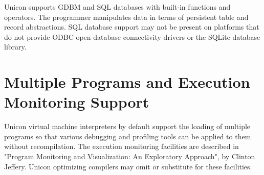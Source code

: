 Unicon supports GDBM and SQL databases with
built-in functions and operators. The programmer manipulates data in
terms of persistent table and record abstractions. SQL database support
may not be present on platforms that do not provide ODBC
open database connectivity drivers or the  SQLite database library.

\section{Multiple Programs and Execution Monitoring Support}

Unicon virtual machine interpreters by default support the loading of
multiple programs so that various debugging and profiling tools can be
applied to them without recompilation. The execution monitoring
facilities are described in "Program Monitoring and
Visualization: An Exploratory Approach", by Clinton
Jeffery. Unicon optimizing compilers may
omit or substitute for these facilities.
